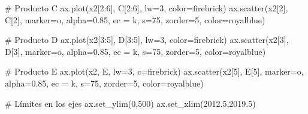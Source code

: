 \documentclass[
  letterpaper,
  DIV=11,
  numbers=noendperiod]{scrreprt}
\newenvironment{Shaded}{\begin{snugshade}}{\end{snugshade}}
\newcommand{\CommentTok}[1]{\textcolor[rgb]{0.37,0.37,0.37}{#1}}
\newcommand{\DecValTok}[1]{\textcolor[rgb]{0.68,0.00,0.00}{#1}}
\newcommand{\FloatTok}[1]{\textcolor[rgb]{0.68,0.00,0.00}{#1}}
\newcommand{\NormalTok}[1]{\textcolor[rgb]{0.00,0.23,0.31}{#1}}
\newcommand{\OperatorTok}[1]{\textcolor[rgb]{0.37,0.37,0.37}{#1}}
\newcommand{\StringTok}[1]{\textcolor[rgb]{0.13,0.47,0.30}{#1}}
\begin{document}
\begin{Shaded}
\begin{Highlighting}[]
\CommentTok{\# Producto C}
\NormalTok{ax.plot(x2[}\DecValTok{2}\NormalTok{:}\DecValTok{6}\NormalTok{], C[}\DecValTok{2}\NormalTok{:}\DecValTok{6}\NormalTok{], lw}\OperatorTok{=}\DecValTok{3}\NormalTok{, color}\OperatorTok{=}\StringTok{\textquotesingle{}firebrick\textquotesingle{}}\NormalTok{)}
\NormalTok{ax.scatter(x2[}\DecValTok{2}\NormalTok{], C[}\DecValTok{2}\NormalTok{], marker}\OperatorTok{=}\StringTok{\textquotesingle{}o\textquotesingle{}}\NormalTok{, alpha}\OperatorTok{=}\FloatTok{0.85}\NormalTok{, ec }\OperatorTok{=} \StringTok{\textquotesingle{}k\textquotesingle{}}\NormalTok{, s}\OperatorTok{=}\DecValTok{75}\NormalTok{, zorder}\OperatorTok{=}\DecValTok{5}\NormalTok{, color}\OperatorTok{=}\StringTok{\textquotesingle{}royalblue\textquotesingle{}}\NormalTok{)}

\CommentTok{\# Producto D}
\NormalTok{ax.plot(x2[}\DecValTok{3}\NormalTok{:}\DecValTok{5}\NormalTok{], D[}\DecValTok{3}\NormalTok{:}\DecValTok{5}\NormalTok{], lw}\OperatorTok{=}\DecValTok{3}\NormalTok{, color}\OperatorTok{=}\StringTok{\textquotesingle{}firebrick\textquotesingle{}}\NormalTok{)}
\NormalTok{ax.scatter(x2[}\DecValTok{3}\NormalTok{], D[}\DecValTok{3}\NormalTok{], marker}\OperatorTok{=}\StringTok{\textquotesingle{}o\textquotesingle{}}\NormalTok{, alpha}\OperatorTok{=}\FloatTok{0.85}\NormalTok{, ec }\OperatorTok{=} \StringTok{\textquotesingle{}k\textquotesingle{}}\NormalTok{, s}\OperatorTok{=}\DecValTok{75}\NormalTok{, zorder}\OperatorTok{=}\DecValTok{5}\NormalTok{, color}\OperatorTok{=}\StringTok{\textquotesingle{}royalblue\textquotesingle{}}\NormalTok{)}

\CommentTok{\# Producto E}
\NormalTok{ax.plot(x2, E, lw}\OperatorTok{=}\DecValTok{3}\NormalTok{, c}\OperatorTok{=}\StringTok{\textquotesingle{}firebrick\textquotesingle{}}\NormalTok{)}
\NormalTok{ax.scatter(x2[}\DecValTok{5}\NormalTok{], E[}\DecValTok{5}\NormalTok{], marker}\OperatorTok{=}\StringTok{\textquotesingle{}o\textquotesingle{}}\NormalTok{, alpha}\OperatorTok{=}\FloatTok{0.85}\NormalTok{, ec }\OperatorTok{=} \StringTok{\textquotesingle{}k\textquotesingle{}}\NormalTok{, s}\OperatorTok{=}\DecValTok{75}\NormalTok{, zorder}\OperatorTok{=}\DecValTok{5}\NormalTok{, color}\OperatorTok{=}\StringTok{\textquotesingle{}royalblue\textquotesingle{}}\NormalTok{)}

\CommentTok{\# Límites en los ejes}
\NormalTok{ax.set\_ylim(}\DecValTok{0}\NormalTok{,}\DecValTok{500}\NormalTok{)}
\NormalTok{ax.set\_xlim(}\FloatTok{2012.5}\NormalTok{,}\FloatTok{2019.5}\NormalTok{)}


\end{Highlighting}
\end{Shaded}
\end{document}
